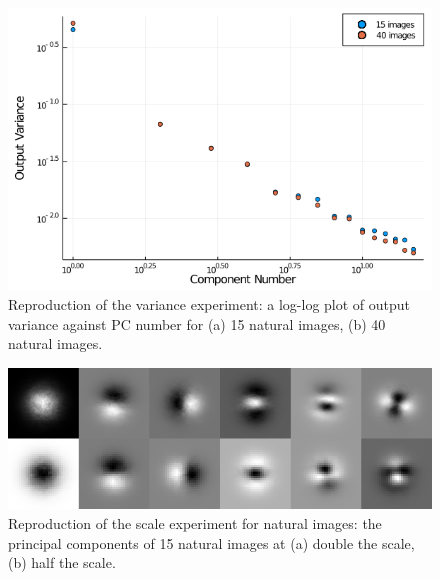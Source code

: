 \begin{figure}
    \centering
    \includegraphics[scale=0.55]{figures/julia-fig5.png}
    \caption{Reproduction of the variance experiment: a log-log plot of output variance against PC number for (a) 15 natural images, (b) 40 natural images.}
    \label{fig:Figure5}
\end{figure}

 \begin{figure}
    \centering
    \includegraphics[scale=0.37]{figures/julia-fig6.png}
    \caption{Reproduction of the scale experiment for natural images: the principal components of 15 natural images at (a) double the scale, (b) half the scale.}
    \label{fig:Figure6}
\end{figure}

